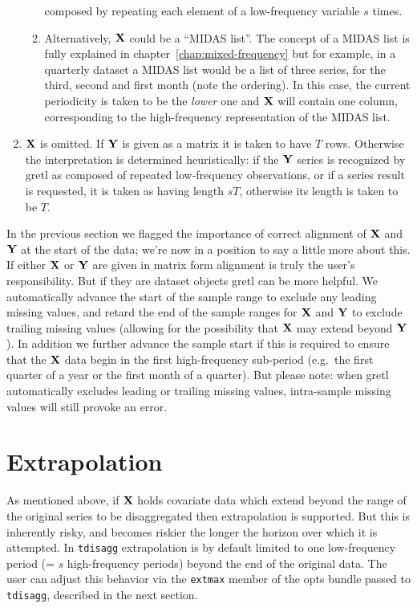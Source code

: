 \begin{enumerate}
\begin{enumerate}
    composed by repeating each element of a low-frequency variable $s$
    times.
  \item Alternatively, $\mathbf{X}$ could be a ``MIDAS list''. The concept of
    a MIDAS list is fully explained in
    chapter~\ref{chap:mixed-frequency} but for example, in a quarterly
    dataset a MIDAS list would be a list of three series, for the
    third, second and first month (note the ordering). In this case,
    the current periodicity is taken to be the \emph{lower} one and
    $\mathbf{X}$ will contain one column, corresponding to the high-frequency
    representation of the MIDAS list.
  \end{enumerate}
\item $\mathbf{X}$ is omitted. If $\mathbf{Y}$ is given as a matrix it is taken to
  have $T$ rows. Otherwise the interpretation is determined
  heuristically: if the $\mathbf{Y}$ series is recognized by gretl as
  composed of repeated low-frequency observations, or if a series
  result is requested, it is taken as having length $sT$, otherwise
  its length is taken to be $T$.
\end{enumerate}

In the previous section we flagged the importance of correct alignment
of $\mathbf{X}$ and $\mathbf{Y}$ at the start of the data; we're now in a position
to say a little more about this. If either $\mathbf{X}$ or $\mathbf{Y}$ are given in
matrix form alignment is truly the user's responsibility. But if they
are dataset objects gretl can be more helpful. We automatically
advance the start of the sample range to exclude any leading missing
values, and retard the end of the sample ranges for $\mathbf{X}$ and $\mathbf{Y}$ to
exclude trailing missing values (allowing for the possibility that
$\mathbf{X}$ may extend beyond $\mathbf{Y}$). In addition we further advance the
sample start if this is required to ensure that the $\mathbf{X}$ data begin
in the first high-frequency sub-period (e.g.\ the first quarter of a
year or the first month of a quarter). But please note: when gretl
automatically excludes leading or trailing missing values,
intra-sample missing values will still provoke an error.

\section{Extrapolation}
\label{sec:extrapolate}

As mentioned above, if $\mathbf{X}$ holds covariate data which extend beyond
the range of the original series to be disaggregated then
extrapolation is supported. But this is inherently risky, and becomes
riskier the longer the horizon over which it is attempted.  In
\texttt{tdisagg} extrapolation is by default limited to one
low-frequency period (= $s$ high-frequency periods) beyond the end of
the original data. The user can adjust this behavior via the
\texttt{extmax} member of the opts bundle passed to \texttt{tdisagg},
described in the next section.


